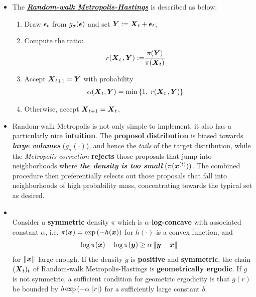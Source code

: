 \documentclass[11pt]{article}
\begin{document}
\begin{itemize}
\item The \underline{\emph{\textbf{Random-walk Metropolis-Hastings}}} is described as below:
\begin{enumerate}
\item Draw $\boldsymbol{\epsilon}_{t}$ from $g_{\sigma}(\boldsymbol{\epsilon})$ and set $\boldsymbol{Y} := \boldsymbol{X}_{t} + \boldsymbol{\epsilon}_{t}$;

\item Compute the ratio:
\begin{align}
r(\boldsymbol{X}_{t}\,, \boldsymbol{Y}):= &\frac{\pi(\boldsymbol{Y})}{\pi(\boldsymbol{X}_{t})} \label{eqn: rw_ratio}
\end{align}

\item Accept $\boldsymbol{X}_{t+1} = \boldsymbol{Y}$ with probability 
\begin{align*}
\alpha(\boldsymbol{X}_{t}, \boldsymbol{Y}) &= \min\left\{1,\;r(\boldsymbol{X}_{t}\,, \boldsymbol{Y})\right\}
\end{align*}

\item Otherwise, accept $\boldsymbol{X}_{t+1} = \boldsymbol{X}_{t}$.
\end{enumerate}

\item Random-walk Metropolis is not only simple to implement, it also has a particularly nice \textbf{intuition}. The \textbf{proposol distribution} is biased towards \emph{\textbf{large volumes}} ($g_{\sigma}(\cdot)$), and hence the \emph{tails} of the target distribution, while the \emph{Metropolis correction} \textbf{rejects} those proposals that jump into neighborhoods where \emph{\textbf{the density is too small}} $(\pi(\boldsymbol{x}^{(t)}))$. The combined procedure then preferentially selects out those proposals that fall into neighborhoods of high probability mass, concentrating towards the typical set as desired.

\item \begin{theorem} \citep{robert1999monte}\\
Consider a \textbf{symmetric} density $\pi$ which is $\alpha$-\textbf{log-concave} with associated constant $\alpha$, i.e. $\pi(\boldsymbol{x}) = \exp\left(- h(\boldsymbol{x})\right)$ for $h(\cdot)$ is a convex function, and
\begin{align}
\log\pi(\boldsymbol{x}) - \log \pi(\boldsymbol{y}) & \ge \alpha\left\|\boldsymbol{y} - \boldsymbol{x}\right\|_{} \label{eqn: log_concave}
\end{align} for $\left\|\boldsymbol{x}\right\|_{}$ large enough. If the density $g$ is \textbf{positive} and \textbf{symmetric}, the chain $(\boldsymbol{X}_{t})_t$ of Random-walk Metropolis-Hastings is \textbf{geometrically ergodic}. If $g$ is not symmetric, a sufficient condition for geometric ergodicity is that $g(r)$ be bounded by $b\exp\left(-\alpha\,\left\lvert r \right\rvert\right)$ for a sufficiently large constant $b$.
\end{theorem}
\end{itemize}
\end{document}

